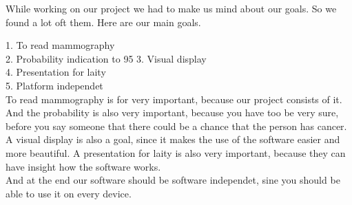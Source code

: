 While working on our project we had to make us mind about our goals. So we found a lot oft them.  Here are our main goals.

1.	To read mammography\\
2.	Probability indication to 95%
3.	Visual display\\
4.	Presentation for laity\\
5.	Platform independet\\

To read mammography is for very important, because our project consists of it. And the probability is also very important, because you have too be very sure, before you say someone that there could be a chance that the person has cancer.\\
 A visual display is also a goal, since it makes the use of the software easier and more beautiful. A presentation for laity is also very important, because they can have insight how the software works. \\
 And at the end our software should be software independet, sine you should be able to use it on every device.
